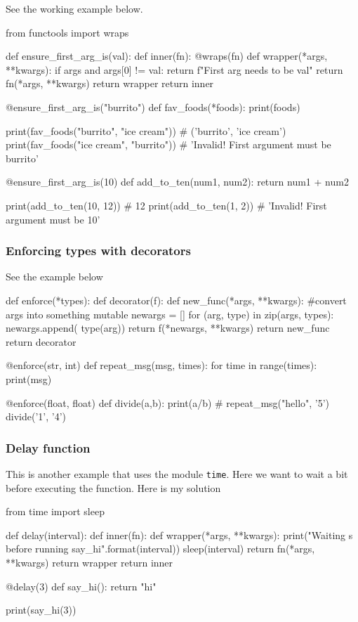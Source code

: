 See the working example below.
\begin{listing}{1}
from functools import wraps

def ensure_first_arg_is(val):
    def inner(fn):
        @wraps(fn)
        def wrapper(*args, **kwargs):
            if args and args[0] != val:
                return f"First arg needs to be {val}"
            return fn(*args, **kwargs)
        return wrapper
    return inner

@ensure_first_arg_is("burrito")
def fav_foods(*foods):
    print(foods)

print(fav_foods("burrito", "ice cream")) # ('burrito', 'ice cream')
print(fav_foods("ice cream", "burrito")) # 'Invalid! First argument must be burrito'

@ensure_first_arg_is(10)
def add_to_ten(num1, num2):
    return num1 + num2

print(add_to_ten(10, 12)) # 12
print(add_to_ten(1, 2)) # 'Invalid! First argument must be 10'    
\end{listing}

\subsubsection{Enforcing types with decorators}

See the example below 
\begin{listing}{1}
def enforce(*types):
    def decorator(f):
        def new_func(*args, **kwargs):
            #convert args into something mutable   
            newargs = []        
            for (arg, type) in zip(args, types):
               newargs.append( type(arg)) 
            return f(*newargs, **kwargs)
        return new_func
    return decorator

@enforce(str, int)
def repeat_msg(msg, times):
	for time in range(times):
		print(msg)

@enforce(float, float)
def divide(a,b):
	print(a/b)
# repeat_msg("hello", '5')
divide('1', '4')    
\end{listing}


\subsubsection{Delay function}

This is another example that uses the module \verb|time|. Here we want to wait a bit before executing the function. Here is my solution
\begin{listing}{1}
from time import sleep

def delay(interval):
    def inner(fn):
        def wrapper(*args, **kwargs):
            print("Waiting {}s before running say_hi".format(interval))
            sleep(interval)
            return fn(*args, **kwargs)
        return wrapper
    return inner

@delay(3)
def say_hi():
    return "hi"    

print(say_hi(3))       
\end{listing}

